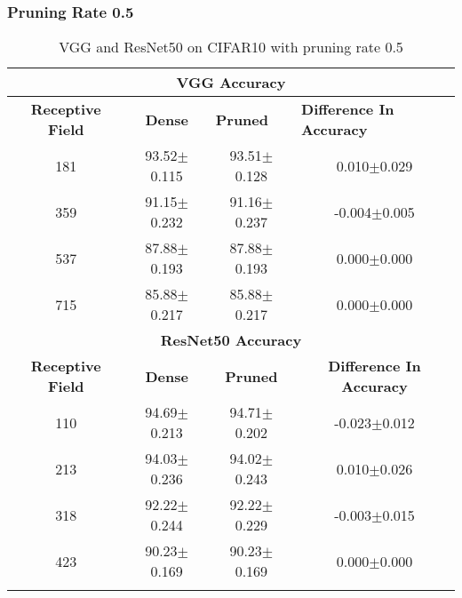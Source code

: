 \subsubsection*{Pruning Rate 0.5}
\begin{table}[H]
  \centering
\begin{tabular}{@{}cccc@{}}
\toprule
\multicolumn{4}{c}{\textbf{VGG Accuracy}}                                                                                                                                  \\ \midrule
\textbf{Receptive Field} & \textbf{Dense} & \multicolumn{1}{l}{\textbf{Pruned}} & \multicolumn{1}{l}{\textbf{Difference In Accuracy}} \\ \midrule
181                      & 93.52$\pm$0.115              & 93.51$\pm$0.128                                   & 0.010$\pm$0.029                                     \\
359                      & 91.15$\pm$0.232              & 91.16$\pm$0.237                                   & -0.004$\pm$0.005                                    \\
537                      & 87.88$\pm$0.193              & 87.88$\pm$0.193                                   & 0.000$\pm$0.000                                     \\
715                      & 85.88$\pm$0.217              & 85.88$\pm$0.217                                   & 0.000$\pm$0.000                                     \\ \midrule
\multicolumn{4}{c}{\textbf{ResNet50 Accuracy}}                                                                                                                             \\ \midrule
\textbf{Receptive Field} & \textbf{Dense} & \textbf{Pruned}                     & \textbf{Difference In Accuracy}                     \\
110                      & 94.69$\pm$0.213              & 94.71$\pm$0.202                                   & -0.023$\pm$0.012                                    \\
213                      & 94.03$\pm$0.236              & 94.02$\pm$0.243                                   & 0.010$\pm$0.026                                     \\
318                      & 92.22$\pm$0.244              & 92.22$\pm$0.229                                   & -0.003$\pm$0.015                                    \\
423                      & 90.23$\pm$0.169              & 90.23$\pm$0.169                                   &
0.000$\pm$0.000                                     \\ \bottomrule \\
\end{tabular}
\caption{VGG and ResNet50 on CIFAR10 with pruning rate 0.5}
\label{tab:cifar10 pruning rate05}
\end{table}
